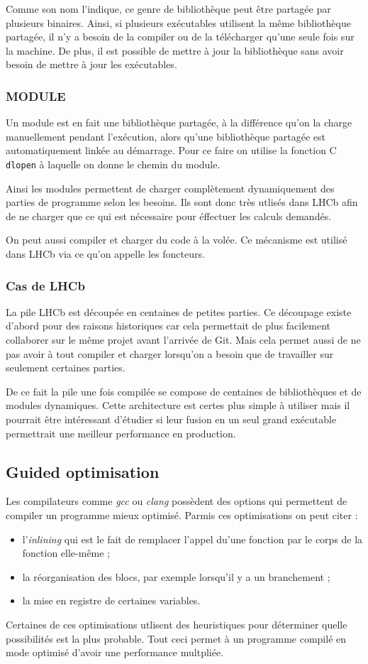 \documentclass[a4paper]{report}
\begin{document}
Comme son nom l'indique, ce genre de bibliothèque peut être partagée par plusieurs binaires.
Ainsi, si plusieurs exécutables utilisent la même bibliothèque partagée, il n'y a besoin de la compiler ou de la télécharger qu'une seule fois sur la machine.
De plus, il est possible de mettre à jour la bibliothèque sans avoir besoin de mettre à jour les exécutables.

\subsubsection{MODULE}
Un module est en fait une bibliothèque partagée, à la différence qu'on la charge manuellement pendant l'exécution, alors qu'une bibliothèque partagée est automatiquement linkée au démarrage.
Pour ce faire on utilise la fonction C \verb'dlopen' à laquelle on donne le chemin du module.

Ainsi les modules permettent de charger complètement dynamiquement des parties de programme selon les besoins.
Ils sont donc très utlisés dans LHCb afin de ne charger que ce qui est nécessaire pour éffectuer les calculs demandés.

On peut aussi compiler et charger du code à la volée.
Ce mécanisme est utilisé dans LHCb via ce qu'on appelle les foncteurs.

\subsubsection{Cas de LHCb}
La pile LHCb est découpée en centaines de petites parties.
Ce découpage existe d'abord pour des raisons historiques car cela permettait de plus facilement collaborer sur le même projet avant l'arrivée de Git.
Mais cela permet aussi de ne pas avoir à tout compiler et charger lorsqu'on a besoin que de travailler sur seulement certaines parties.

De ce fait la pile une fois compilée se compose de centaines de bibliothèques et de modules dynamiques.
Cette architecture est certes plus simple à utiliser mais il pourrait être intéressant d'étudier si leur fusion en un seul grand exécutable permettrait une meilleur performance en production.

\subsection{Guided optimisation}
Les compilateurs comme \emph{gcc} ou \emph{clang} possèdent des options qui permettent de compiler un programme mieux optimisé.
Parmis ces optimisations on peut citer :
\begin{itemize}
    \item l'\emph{inlining} qui est le fait de remplacer l'appel du'une fonction par le corps de la fonction elle-même ;
    \item la réorganisation des blocs, par exemple lorsqu'il y a un branchement ;
    \item la mise en registre de certaines variables.
\end{itemize}
Certaines de ces optimisations utlisent des heuristiques pour déterminer quelle possibilités est la plus probable.
Tout ceci permet à un programme compilé en mode optimisé d'avoir une performance multpliée.
\end{document}
